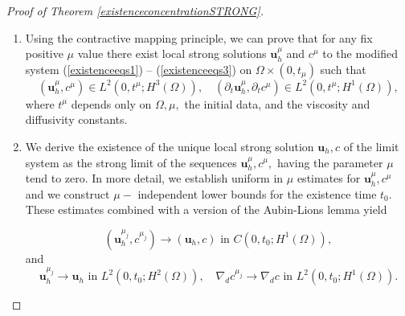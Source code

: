 \documentclass[12pt]{report}
\numberwithin{theorem}{chapter}
\numberwithin{corollary}{chapter}
\numberwithin{lemma}{chapter}
\numberwithin{remark}{chapter}
\numberwithin{definition}{chapter}
\numberwithin{prop}{chapter}
\newcommand*\diff{\mathop{}\!\mathrm{d}}
\begin{document}
\begin{proof}[Proof of Theorem \ref{existenceconcentrationSTRONG}]
\begin{enumerate}
  \begin{equation} \label{existenceeqs2}
    \nabla_h \cdot \bar{\mathbf{u}}_h = 0,
  \end{equation}
  
  \begin{equation} \label{existenceeqs3}
    \begin{split}
      \partial_t c+ \mathbf{u}_h \cdot \nabla_h c + \bigg ( - & \int_{-a}^z \nabla_h \cdot \mathbf{u}_h (x, y, \xi, t) \diff \xi \bigg ) \cdot \bigg (\partial_3 c - \frac{1}{a} \bigg ) \\
      & - \Delta_{d} c - \mu \partial_{11} c = 0.
    \end{split}
  \end{equation}
  
  Here $\bar{\mathbf{u}}_h$ is the vertically averaged version of the function, i.e. $$\frac{1}{2a} \int_{-a}^a \mathbf{u}_h (x,y,z) \diff z,$$ and $p_s$ is the classical notation for a pressure function depending on only the horizontal variables. Fore more details of this standard reformulation process see for example \cite{cao2014local} and \cite{cao2007global}.
  
  \item Using the contractive mapping principle, we can prove that for any fix positive $\mu$ value there exist local strong solutions $\mathbf{u}_h^\mu$ and $c^\mu$ to the modified system (\ref{existenceeqs1}) -- (\ref{existenceeqs3}) on $\Omega \times (0, t_\mu)$ such that
%
  \[ (\mathbf{u}_h^\mu, c^\mu) \in L^2 (0, t^\mu; H^3(\Omega)), \quad (\partial_t \mathbf{u}_h^\mu, \partial_t c^\mu) \in L^2 (0, t^\mu; H^1 (\Omega)), \]
%
  where $t^\mu$ depends only on $\Omega, \mu, $ the initial data, and the viscosity and diffusivity constants.
  
  \item We derive the existence of the unique local strong solution $\mathbf{u}_h, c$ of the limit system as the strong limit of the sequences $\mathbf{u}_h^\mu, c^\mu,$ having the parameter $\mu$ tend to zero. In more detail, we establish uniform in $\mu$ estimates for $\mathbf{u}_h^\mu, c^\mu$ and we construct $\mu-$ independent lower bounds for the existence time $t_0$. These estimates combined with a version of the Aubin-Lions lemma yield
  
  \begin{equation}
    (\mathbf{u}_h^{\mu_j}, c^{\mu_j}) \to (\mathbf{u}_h, c) \text{ in } C(0, t_0; H^1(\Omega)),
  \end{equation}
%
  and
%
  \begin{equation}
    \mathbf{u}_h^{\mu_j} \to \mathbf{u}_h \text{ in } L^2(0, t_0; H^2(\Omega)), \quad \nabla_d c^{\mu_j} \to \nabla_d c \text{ in } L^2(0, t_0; H^1(\Omega)).
  \end{equation}
  

\end{enumerate}
\end{proof}
\end{document}

